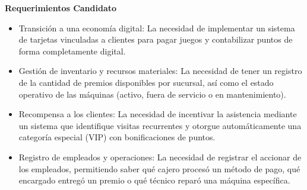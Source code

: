 \item \textbf{Requerimientos Candidato}

\begin{itemize}
        \item Transición a una economía digital:
        La necesidad de implementar un sistema de tarjetas vinculadas a clientes para pagar juegos y contabilizar puntos de forma completamente digital.
        \item Gestión de inventario y recursos materiales:
        La necesidad de tener un registro de la cantidad de premios disponibles por sucursal, así como el estado operativo de las máquinas (activo, fuera de servicio o en mantenimiento).
        \item Recompensa a los clientes:
        La necesidad de incentivar la asistencia mediante un sistema que identifique visitas recurrentes y otorgue automáticamente una categoría especial (VIP) con bonificaciones de puntos.
        \item Registro de empleados y operaciones:
        La necesidad de registrar el accionar de los empleados, permitiendo saber qué cajero procesó un método de pago, qué encargado entregó un premio o qué técnico reparó una máquina específica.        
\end{itemize}
